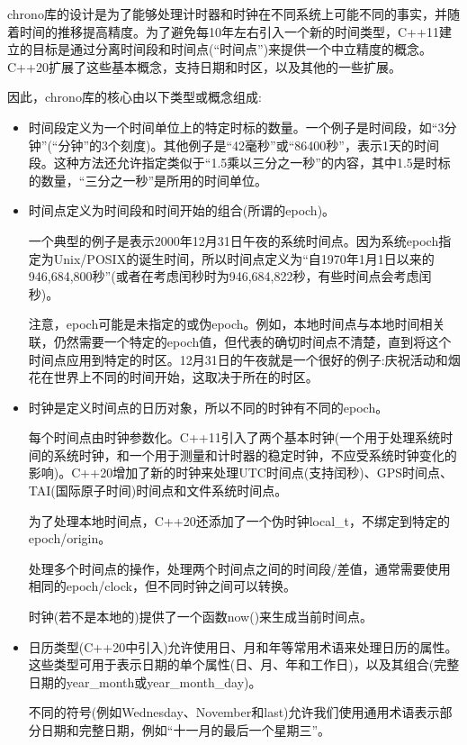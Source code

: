 chrono库的设计是为了能够处理计时器和时钟在不同系统上可能不同的事实，并随着时间的推移提高精度。为了避免每10年左右引入一个新的时间类型，C++11建立的目标是通过分离时间段和时间点(“时间点”)来提供一个中立精度的概念。C++20扩展了这些基本概念，支持日期和时区，以及其他的一些扩展。

因此，chrono库的核心由以下类型或概念组成:

\begin{itemize}
\item
时间段定义为一个时间单位上的特定时标的数量。一个例子是时间段，如“3分钟”(“分钟”的3个刻度)。其他例子是“42毫秒”或“86400秒”，表示1天的时间段。这种方法还允许指定类似于“1.5乘以三分之一秒”的内容，其中1.5是时标的数量，“三分之一秒”是所用的时间单位。

\item
时间点定义为时间段和时间开始的组合(所谓的epoch)。

一个典型的例子是表示2000年12月31日午夜的系统时间点。因为系统epoch指定为Unix/POSIX的诞生时间，所以时间点定义为“自1970年1月1日以来的946,684,800秒”(或者在考虑闰秒时为946,684,822秒，有些时间点会考虑闰秒)。

注意，epoch可能是未指定的或伪epoch。例如，本地时间点与本地时间相关联，仍然需要一个特定的epoch值，但代表的确切时间点不清楚，直到将这个时间点应用到特定的时区。12月31日的午夜就是一个很好的例子:庆祝活动和烟花在世界上不同的时间开始，这取决于所在的时区。

\item
时钟是定义时间点的日历对象，所以不同的时钟有不同的epoch。

每个时间点由时钟参数化。C++11引入了两个基本时钟(一个用于处理系统时间的系统时钟，和一个用于测量和计时器的稳定时钟，不应受系统时钟变化的影响)。C++20增加了新的时钟来处理UTC时间点(支持闰秒)、GPS时间点、TAI(国际原子时间)时间点和文件系统时间点。

为了处理本地时间点，C++20还添加了一个伪时钟local\_t，不绑定到特定的epoch/origin。

处理多个时间点的操作，处理两个时间点之间的时间段/差值，通常需要使用相同的epoch/clock，但不同时钟之间可以转换。

时钟(若不是本地的)提供了一个函数now()来生成当前时间点。

\item
日历类型(C++20中引入)允许使用日、月和年等常用术语来处理日历的属性。这些类型可用于表示日期的单个属性(日、月、年和工作日)，以及其组合(完整日期的year\_month或year\_month\_day)。

不同的符号(例如Wednesday、November和last)允许我们使用通用术语表示部分日期和完整日期，例如“十一月的最后一个星期三”。


\end{itemize}
